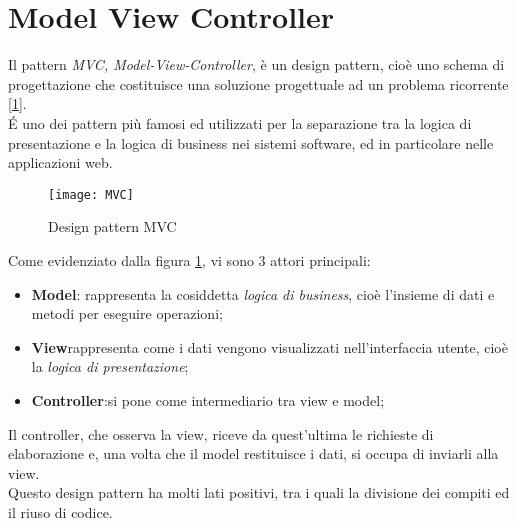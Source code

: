 \section{Model View Controller}
\label{sec:MVC}
Il pattern \emph{MVC, Model-View-Controller}, è un design pattern, cioè uno schema di progettazione che costituisce una soluzione progettuale ad un problema ricorrente \hyperlink{01}{[1]}.\\
\'E uno dei pattern più famosi ed utilizzati per la separazione tra la logica di presentazione e la logica di business nei sistemi software, ed in particolare nelle applicazioni web.\\
\begin{figure}[h]
	\centering
	\texttt{[image: MVC]}
	\caption{Design pattern MVC}
	\label{mvc-schema}
\end{figure}
Come evidenziato dalla figura \ref{mvc-schema}, vi sono 3 attori principali:
\begin{itemize}
	\item \textbf{Model}: rappresenta la cosiddetta \emph{logica di business}, cioè l'insieme di dati e metodi per eseguire operazioni;
	\item \textbf{View}rappresenta come i dati vengono visualizzati nell'interfaccia utente, cioè la \emph{logica di presentazione};
	\item \textbf{Controller}:si pone come intermediario tra view e model;
\end{itemize}
Il controller, che osserva la view, riceve da quest'ultima le richieste di elaborazione e, una volta che il model restituisce i dati, si occupa di inviarli alla view.\\
Questo design pattern ha molti lati positivi, tra i quali la divisione dei compiti ed il riuso di codice.\\


\newpage